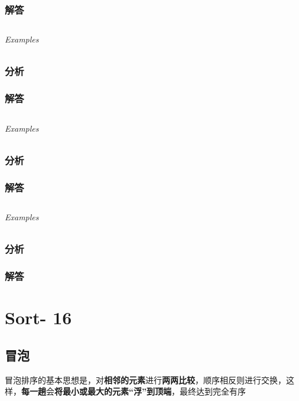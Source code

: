 \documentclass[UTF8,a4paper,12pt]{ctexbook}
\begin{document}
	\subsection{解答}
	
\section{}
	
	\subparagraph{Examples}
	
	\subsection{分析}
	
	\subsection{解答}
	
\section{}
	
	\subparagraph{Examples}
	
	\subsection{分析}
	
	\subsection{解答}
	
\section{}
	
	\subparagraph{Examples}
	
	\subsection{分析}
	
	\subsection{解答}
\chapter{Sort- 16}
\section{冒泡}
	冒泡排序的基本思想是，对\textbf{相邻的元素}进行\textbf{两两比较}，顺序相反则进行交换，这样，\textbf{每一趟}会\textbf{将最小或最大的元素“浮”到顶端}，最终达到完全有序
	
\end{document}
